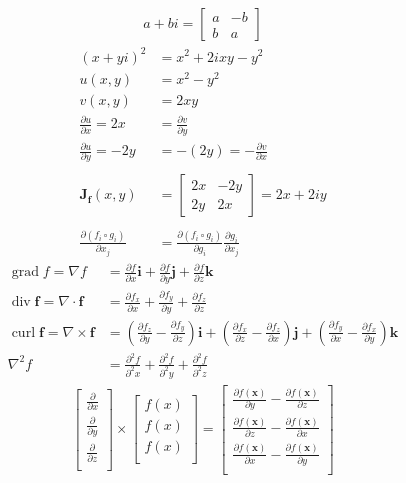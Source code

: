 \documentclass[a4paper,11pt]{article}
\theoremstyle{plain}
\theoremstyle{definition}
\newcommand{\J}{\mathbf{J}}
\newcommand{\del}{\partial}
\DeclareMathOperator{\grad}{grad}
\DeclareMathOperator{\dive}{div}
\DeclareMathOperator{\curl}{curl}
\begin{document}
\begin{align}
	a+bi = \begin{bmatrix} a & -b \\ b & a \end{bmatrix}
\end{align}
\begin{align*}
	(x+yi)^2 &= x^2+2ixy-y^2\\
	u(x,y) &= x^2-y^2 \\
	v(x,y) &= 2xy \\
	\frac{\del u}{\del x} = 2x &= \frac{\del v}{\del y} \\
	\frac{\del u}{\del y} = -2y &= -(2y) = -\frac{\del v}{\del x}\\
	\\
	\J_{\mathbf{f}}(x,y) &=
	\begin{bmatrix}
		2x & -2y \\
		2y & 2x
	\end{bmatrix}
	= 2x+2iy \\
	\\
	\frac{\del (f_i\circ g_i)}{\del x_j} &= \frac{\del (f_i\circ g_i)}{\del
	g_i}\frac{\del g_i}{\del x_j}
\end{align*}
\begin{align*}
	\grad f = \nabla f &=\frac{\del f}{\del x}\mathbf{i}
	+\frac{\del f}{\del y}\mathbf{j}
	+\frac{\del f}{\del z}\mathbf{k} \\
	\dive \mathbf{f} = \nabla \cdot \mathbf{f} &= \frac{\del f_x}{\del x} + \frac{\del
	f_y}{\del y} + \frac{\del f_z}{\del z} \\
	\curl\mathbf{f} = \nabla \times \mathbf{f} &=
	\left(\frac{\del f_z}{\del y}-\frac{\del f_y}{\del z}\right)\mathbf{i}
	+\left(\frac{\del f_x}{\del z}-\frac{\del f_z}{\del x}\right)\mathbf{j}
	+\left(\frac{\del f_y}{\del x}-\frac{\del f_x}{\del y}\right)\mathbf{k}\\
	\nabla^2 f &=
	\frac{\del^2 f}{\del^2 x} +
	\frac{\del^2 f}{\del^2 y} +
	\frac{\del^2 f}{\del^2 z}
\end{align*}
\begin{align*}
	\begin{bmatrix}
		\frac{\del}{\del x} \\
		\frac{\del}{\del y} \\
		\frac{\del}{\del z} \\
	\end{bmatrix}
	{\times}
	\begin{bmatrix}
		f(x) \\
		f(x) \\
		f(x) \\
	\end{bmatrix}
	=
	\begin{bmatrix}
		\frac{\del f(\mathbf{x})}{\del y}-\frac{\del f(\mathbf{x})}{\del z} \\
		\frac{\del f(\mathbf{x})}{\del z}-\frac{\del f(\mathbf{x})}{\del x} \\
		\frac{\del f(\mathbf{x})}{\del x}-\frac{\del f(\mathbf{x})}{\del y} \\
	\end{bmatrix}
\end{align*}
\end{document}
